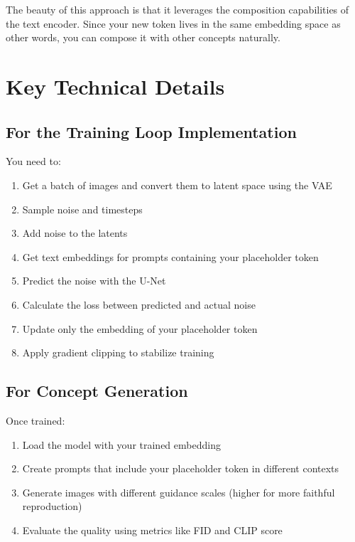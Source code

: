 The beauty of this approach is that it leverages the composition capabilities of the text encoder. Since your new token lives in the same embedding space as other words, you can compose it with other concepts naturally.

\section*{Key Technical Details}

\subsection*{For the Training Loop Implementation}
You need to:
\begin{enumerate}
  \item Get a batch of images and convert them to latent space using the VAE
  \item Sample noise and timesteps
  \item Add noise to the latents
  \item Get text embeddings for prompts containing your placeholder token
  \item Predict the noise with the U-Net
  \item Calculate the loss between predicted and actual noise
  \item Update only the embedding of your placeholder token
  \item Apply gradient clipping to stabilize training
\end{enumerate}

\subsection*{For Concept Generation}
Once trained:
\begin{enumerate}
  \item Load the model with your trained embedding
  \item Create prompts that include your placeholder token in different contexts
  \item Generate images with different guidance scales (higher for more faithful reproduction)
  \item Evaluate the quality using metrics like FID and CLIP score
\end{enumerate}

